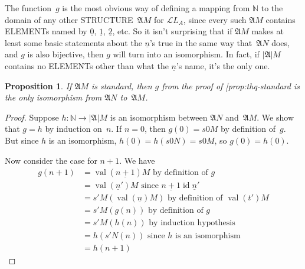 \documentclass[10pt,a4paper]{article}
\makeatletter
\newcommand*{\olup}[1]{\MakeUppercase{#1}}
\theoremstyle{plain}
\newtheorem{prop}[thm]{Proposition}
\theoremstyle{definition}
\theoremstyle{remark}
\newenvironment{explain}{}{}
\newcommand*{\ollabel}[1]{\label{#1}}
\newcommand{\olref}{\@ifnextchar[{\olref@i}{\olref@final}}
\def\olref@i[#1]{\@ifnextchar[{\olref@ii}{\olref@final}}
\def\olref@ii[#1]{\@ifnextchar[{\olref@iii}{\olref@final}}
\def\olref@iii[#1]{\olref@final}
\def\olref@final#1{\ref{#1}}
\providecommand{\Obj}{}
\providecommand{\Struct}{\ensuremath{\mathfrak{A}}}
\providecommand{\Domain}{\ensuremath{|\mathfrak{A}|}}
\providecommand{\Assign}{\ensuremath{s}}
\providecommand{\Lang}{\ensuremath{\mathcal{L}}}
\providecommand{\num}[1]{\underline{#1}}
\providecommand{\Nat}{\ensuremath{\mathbb{N}}}
\providecommand{\Value}[1]{\operatorname{val}(#1)}
\providecommand{\ident}{\operatorname{id}}
\makeatother
\begin{document}
\begin{explain}
The function~$g$ is the most obvious way of defining a mapping from
$\Nat$ to the domain of any other \olup{structure}~$\Struct{M}$ for
$\Lang{L_A}$, since every such $\Struct{M}$ contains \olup{element}s named
by $\num{0}$, $\num{1}$, $\num{2}$, etc. So it isn't surprising that
if $\Struct{M}$ makes at least some basic statements about the
$\num{n}$'s true in the same way that~$\Struct{N}$ does, and $g$ is
also bijective, then $g$ will turn into an isomorphism.  In fact, if
$\Domain{M}$ contains no \olup{element}s other than what the $\num{n}$'s
name, it's the only one.
\end{explain}

\begin{prop}
\ollabel{prop:thq-unique-iso} If $\Struct{M}$ is standard, then $g$ from
the proof of \olref{prop:thq-standard} is the only isomorphism from $\Struct{N}$ to~$\Struct{M}$.
\end{prop}

\begin{proof}
Suppose $h\colon \Nat \to \Domain{M}$ is an isomorphism between
$\Struct{N}$ and~$\Struct{M}$. We show that $g = h$ by induction
on~$n$. If $n = 0$, then $g(0) = \Assign{\Obj{0}}{M}$ by definition
of~$g$. But since $h$ is an isomorphism, $h(0) =
h(\Assign{\Obj{0}}{N}) =\Assign{\Obj{0}}{M}$, so $g(0) = h(0)$.

Now consider the case for $n+1$. We have
\begin{align*}
  g(n+1) & = \Value{\num{n+1}}{M} \text{ by definition of~$g$}\\
  & = \Value{\num{n}'}{M} \text{ since $\num{n+1}\ident \num{n}'$}\\
  & = \Assign{\prime}{M}(\Value{\num{n}}{M}) 
    \text{ by definition of $\Value{t'}{M}$}\\
  & = \Assign{\prime}{M}(g(n))  \text{ by definition of~$g$}\\
  & = \Assign{\prime}{M}(h(n)) \text{ by induction hypothesis}\\
  & = h(\Assign{\prime}{N}(n)) \text{ since $h$ is an isomorphism}\\
  & = h(n+1)
\end{align*}
\end{proof}
\end{document}
